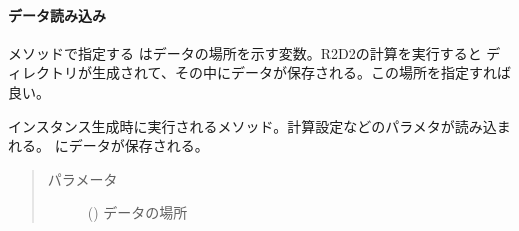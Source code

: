 \documentclass[letterpaper,10pt,dvipdfmx,report]{sphinxmanual}
\begin{document}
\paragraph{データ読み込み}
\label{\detokenize{io:id5}}
メソッドで指定する  はデータの場所を示す変数。R2D2の計算を実行すると  ディレクトリが生成されて、その中にデータが保存される。この場所を指定すれば良い。

\begin{fulllineitems}
\label{\detokenize{io:R2D2.R2D2_data.__init__}}
インスタンス生成時に実行されるメソッド。計算設定などのパラメタが読み込まれる。 {\hyperref[\detokenize{io:R2D2.R2D2_data.p}]{}} にデータが保存される。
\begin{quote}\begin{description}
\item[{パラメータ}] \leavevmode
{} () \sphinxhyphen{}\sphinxhyphen{} データの場所

\end{description}\end{quote}

\end{fulllineitems}

\end{document}

